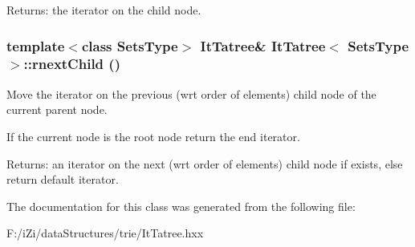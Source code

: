 \begin{Desc}
\item[Returns:]the iterator on the child node. \end{Desc}
\subsubsection{\setlength{\rightskip}{0pt plus 5cm}template$<$class Sets\-Type$>$ {\bf It\-Tatree}\& {\bf It\-Tatree}$<$ Sets\-Type $>$::rnext\-Child ()\hspace{0.3cm}{\tt  [inline]}}\label{class_it_tatree_f9959fb0b66e15672951fe19fd0019e1}


Move the iterator on the previous (wrt order of elements) child node of the current parent node. 

If the current node is the root node return the end iterator. \begin{Desc}
\item[Returns:]an iterator on the next (wrt order of elements) child node if exists, else return default iterator. \end{Desc}


The documentation for this class was generated from the following file:\begin{CompactItemize}
\item 
F:/i\-Zi/data\-Structures/trie/It\-Tatree.hxx\end{CompactItemize}
